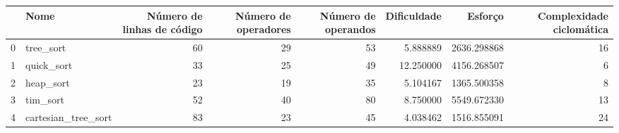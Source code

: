 \begin{tabular}{llrrrrrr}
\toprule
{} &                 Nome &  Número de linhas de código &  Número de operadores &  Número de operandos &  Dificuldade &      Esforço &  Complexidade ciclomática \\
\midrule
0 &            tree\_sort &                          60 &                    29 &                   53 &     5.888889 &  2636.298868 &                        16 \\
1 &           quick\_sort &                          33 &                    25 &                   49 &    12.250000 &  4156.268507 &                         6 \\
2 &            heap\_sort &                          23 &                    19 &                   35 &     5.104167 &  1365.500358 &                         8 \\
3 &             tim\_sort &                          52 &                    40 &                   80 &     8.750000 &  5549.672330 &                        13 \\
4 &  cartesian\_tree\_sort &                          83 &                    23 &                   45 &     4.038462 &  1516.855091 &                        24 \\
\bottomrule
\end{tabular}
